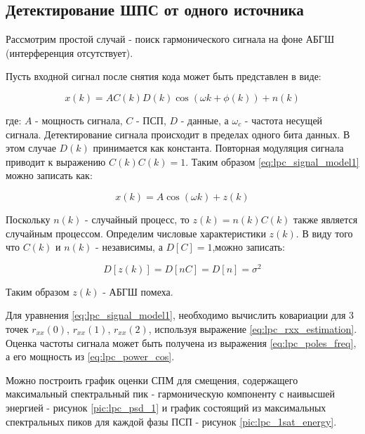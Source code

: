 \subsection{Детектирование ШПС от одного источника}
Рассмотрим простой случай - поиск гармонического сигнала на фоне АБГШ (интерференция отсутствует).

Пусть входной сигнал после снятия кода может быть представлен в виде:
\begin{center}
\begin{equation}
	\label{eq:lpc_signal_model1}
	x(k) = AC(k)D(k)\cos(\omega k + \phi(k)) + n(k)
\end{equation}
\end{center}
где: ${A}$ - мощность сигнала, ${C}$ - ПСП, ${D}$ - данные, а ${\omega_{c}}$ - частота несущей сигнала.
Детектирование сигнала происходит в пределах одного бита данных. В этом случае ${D(k)}$
принимается как константа. Повторная модуляция сигнала приводит к выражению ${C(k)C(k)=1}$.
Таким образом \ref{eq:lpc_signal_model1} можно записать как:
\begin{center}
\begin{equation}
	\label{eq:lpc_signal_model2}
	x(k)= A \cos{(\omega k)} + z(k)
\end{equation}
\end{center}

Поскольку ${n(k)}$ - случайный процесс, то ${z(k) = n(k)C(k)}$ также является
случайным процессом. Определим числовые характеристики ${z(k)}$.
В виду того что ${C(k)}$ и ${n(k)}$ - независимы, а ${D[C] = 1}$,можно записать:
\begin{center}
\begin{equation}
	D[z(k)] = D[nC] = D[n] = \sigma ^2
\end{equation}
\end{center}
Таким образом ${z(k)}$ - АБГШ помеха.

Для уравнения \ref{eq:lpc_signal_model1}, необходимо вычислить ковариации для 3 точек
${r_{xx}(0)}$, ${r_{xx}(1)}$, ${r_{xx}(2)}$, используя выражение \ref{eq:lpc_rxx_estimation}.
Оценка частоты сигнала может быть получена из выражения \ref{eq:lpc_poles_freq}, а его
мощность из \ref{eq:lpc_power_cos}.

Можно построить график оценки СПМ для смещения,
содержащего максимальный спектральный пик - гармоническую компоненту
с наивысшей энергией - рисунок \ref{pic:lpc_psd_1} и график состоящий из максимальных спектральных пиков для каждой фазы
ПСП - рисунок \ref{pic:lpc_1sat_energy}.

